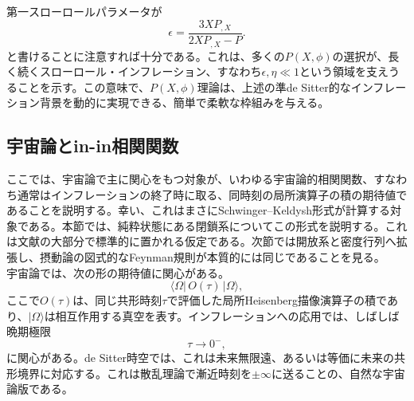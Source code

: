 \documentclass[a4paper,11pt,oneside]{article}
\theoremstyle{definition}
\numberwithin{equation}{section}
\begin{document}
第一スローロールパラメータが
\begin{equation}
\epsilon
=
\frac{3X P_{,X}}{2X P_{,X}-P} .
\end{equation}
と書けることに注意すれば十分である。これは、多くの\(P(X,\phi)\)の選択が、長く続くスローロール・インフレーション、すなわち\(\epsilon,\eta\ll 1\)という領域を支えうることを示す。この意味で、\(P(X,\phi)\)理論は、上述の準de Sitter的なインフレーション背景を動的に実現できる、簡単で柔軟な枠組みを与える。





\subsection{宇宙論とin-in相関関数}



ここでは、宇宙論で主に関心をもつ対象が、いわゆる宇宙論的相関関数、すなわち通常はインフレーションの終了時に取る、同時刻の局所演算子の積の期待値であることを説明する。幸い、これはまさにSchwinger--Keldysh形式が計算する対象である。本節では、純粋状態にある閉鎖系についてこの形式を説明する。これは文献の大部分で標準的に置かれる仮定である。次節では開放系と密度行列へ拡張し、摂動論の図式的なFeynman規則が本質的には同じであることを見る。\\





宇宙論では、次の形の期待値に関心がある。
\begin{equation}
\langle \Omega | \, O(\tau)\, | \Omega \rangle ,
\end{equation}
ここで\(O(\tau)\)は、同じ共形時刻\(\tau\)で評価した局所Heisenberg描像演算子の積であり、\(|\Omega\rangle\)は相互作用する真空を表す。インフレーションへの応用では、しばしば晩期極限
\begin{equation}
\tau \to 0^- ,
\end{equation}
に関心がある。de Sitter時空では、これは未来無限遠、あるいは等価に未来の共形境界に対応する。これは散乱理論で漸近時刻を\(\pm\infty\)に送ることの、自然な宇宙論版である。
\end{document}
